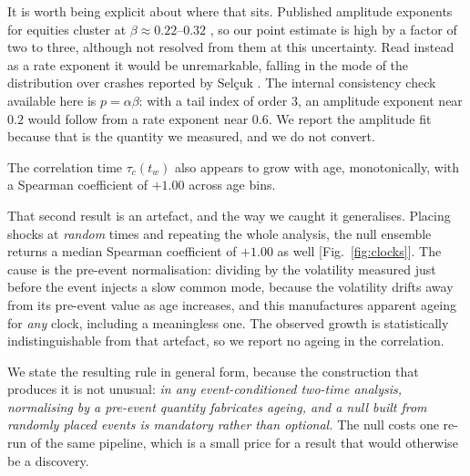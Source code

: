 \documentclass[aps,pre,twocolumn,superscriptaddress,floatfix,nofootinbib]{revtex4-2}
\begin{document}
It is worth being explicit about where that sits. Published amplitude
exponents for equities cluster at $\beta \approx 0.22$--$0.32$
\cite{lillo2003,zawadowski2006}, so our point estimate is high by a factor of
two to three, although not resolved from them at this uncertainty. Read
instead as a rate exponent it would be unremarkable, falling in the mode of
the distribution over crashes reported by Selçuk \cite{selcuk2004}. The
internal consistency check available here is $p = \alpha\beta$: with a tail
index of order $3$, an amplitude exponent near $0.2$ would follow from a rate
exponent near $0.6$. We report the amplitude fit because that is the quantity
we measured, and we do not convert.

The correlation time $\tau_c(t_w)$ also appears to grow with age,
monotonically, with a Spearman coefficient of $+1.00$ across age bins.

That second result is an artefact, and the way we caught it generalises. Placing
shocks at \emph{random} times and repeating the whole analysis, the null
ensemble returns a median Spearman coefficient of $+1.00$ as well
[Fig.~\ref{fig:clocks}]. The cause is the pre-event normalisation: dividing by
the volatility measured just before the event injects a slow common mode,
because the volatility drifts away from its pre-event value as age increases,
and this manufactures apparent ageing for \emph{any} clock, including a
meaningless one. The observed growth is statistically indistinguishable from
that artefact, so we report no ageing in the correlation.

We state the resulting rule in general form, because the construction that
produces it is not unusual: \emph{in any event-conditioned two-time analysis,
normalising by a pre-event quantity fabricates ageing, and a null built from
randomly placed events is mandatory rather than optional.} The null costs one
re-run of the same pipeline, which is a small price for a result that would
otherwise be a discovery.
\end{document}
